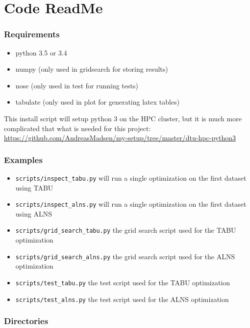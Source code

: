 \section{Code ReadMe}

\subsubsection*{Requirements}

\begin{itemize}[noitemsep]
\item python 3.5 or 3.4
\item numpy (only used in gridsearch for storing results)
\item nose (only used in test for running tests)
\item tabulate (only used in plot for generating latex tables)
\end{itemize}

This install script will setup python 3 on the HPC cluster, but it is much
more complicated that what is needed for this project:
\url{https://github.com/AndreasMadsen/my-setup/tree/master/dtu-hpc-python3}

\subsubsection*{Examples}

\begin{itemize}[noitemsep]
\item \texttt{scripts/inspect\_tabu.py} will run a single optimization on the first dataset using TABU
\item \texttt{scripts/inspect\_alns.py} will run a single optimization on the first dataset using ALNS
\item \texttt{scripts/grid\_search\_tabu.py} the grid search script used for the TABU optimization
\item \texttt{scripts/grid\_search\_alns.py} the grid search script used for the ALNS optimization
\item \texttt{scripts/test\_tabu.py} the test script used for the TABU optimization
\item \texttt{scripts/test\_alns.py} the test script used for the ALNS optimization
\end{itemize}

\subsubsection*{Directories}

